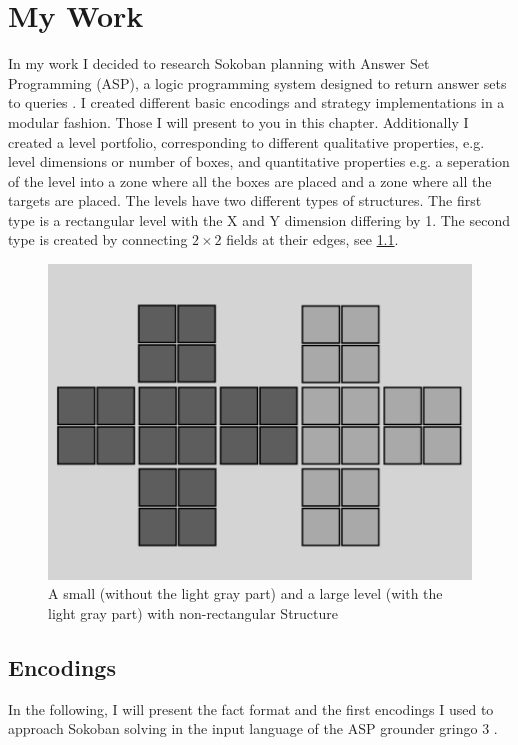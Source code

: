 \documentclass[12pt,a4paper,oneside]{report}
\begin{document}
\chapter{My Work}
In my work I decided to research Sokoban planning with Answer Set Programming (ASP), a logic programming system designed to return answer sets to queries \cite{LifschitzASP}. I created different basic encodings and strategy implementations in a modular fashion. Those I will present to you in this chapter. Additionally I created a level portfolio, corresponding to different qualitative properties, e.g. level dimensions or number of boxes, and quantitative properties e.g. a seperation of the level into a zone where all the boxes are placed and a zone where all the targets are placed. The levels have two different types of structures. The first type is a rectangular level with the X and Y dimension differing by 1. The second type is created by connecting $2 \times 2$ fields at their edges, see \ref{fig:levelCrooked}.
\begin{figure}[ht]
\centering
\includegraphics[scale=0.2]{CrookedLevel}
\caption{A small (without the light gray part) and a large level (with the light gray part) with non-rectangular Structure}
\label{fig:levelCrooked}
\end{figure}
\section{Encodings}
In the following, I will present the fact format and the first encodings I used to approach Sokoban solving in the input language of the ASP grounder gringo 3 \cite{Potassco}.
\end{document}

